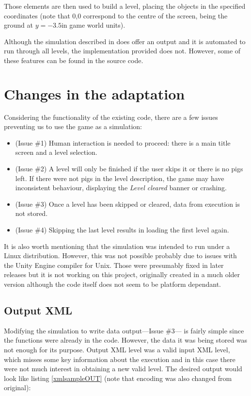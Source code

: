 Those elements are then used to build a level, placing the objects in the specified coordinates (note that 0,0 correspond to the centre of the screen, being the ground at $y=-3.5$in game world units).

Although the simulation described in \cite{ferreira2014search} does offer an output and it is automated to run through all levels, the implementation provided does not. However, some of these features can be found in the source code.

\section{Changes in the adaptation}
Considering the functionality of the existing code, there are a few issues preventing us to use the game as a simulation:

\begin{itemize}
	\item (Issue \#1) Human interaction is needed to proceed: there is a main title screen and a level selection.
	\item (Issue \#2) A level will only be finished if the user skips it or there is no pigs left. If there were not pigs in the level description, the game may have inconsistent behaviour, displaying the \textit{Level cleared} banner or crashing.
	\item (Issue \#3) Once a level has been skipped or cleared, data from execution is not stored.
	\item (Issue \#4) Skipping the last level results in loading the first level again. 
\end{itemize}

It is also worth mentioning that the simulation was intended to run under a Linux distribution. However, this was not possible probably due to issues with the Unity Engine compiler for Unix. Those were presumably fixed in later releases but it is not working on this project, originally created in a much older version although the code itself does not seem to be platform dependant.


\subsection{Output XML}

Modifying the simulation to write data output---Issue \#3--- is fairly simple since the functions were already in the code. However, the data it was being stored was not enough for its purpose. Output XML level was a valid input XML level, which misses some key information about the execution and in this case there were not much interest in obtaining a new valid level. The desired output would look like listing \ref{xmlsampleOUT} (note that encoding was also changed from original):

